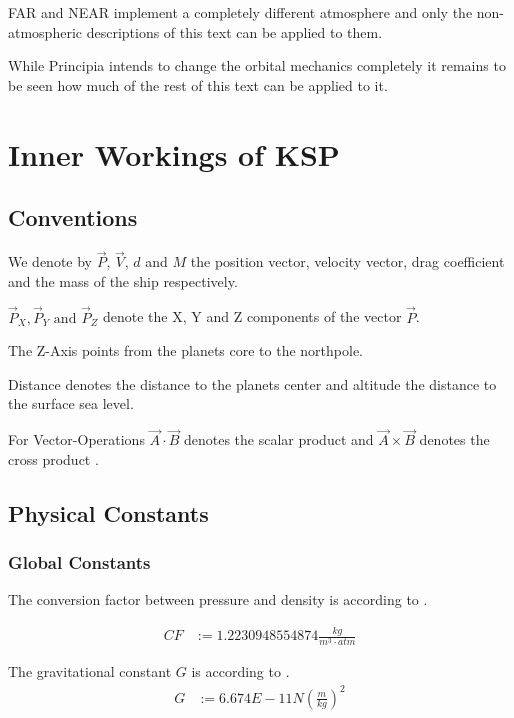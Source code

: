 \documentclass[11pt]{report}
\newcommand{\oa}[1]{\overrightarrow{#1}}
\newcommand{\Pos}{\oa{P}}
\newcommand{\Vel}{\oa{V}}
\begin{document}
FAR \cite{FAR} and NEAR \cite{NEAR} implement a completely different
atmosphere and only the non-atmospheric descriptions of this text can
be applied to them.

While Principia \cite{principia} intends to change the orbital
mechanics completely it remains to be seen how much of the rest of
this text can be applied to it.

\part{Inner Workings of KSP}\label{InnerWorkings}

\chapter{Conventions}

We denote by $\Pos$, $\Vel$, $d$ and $M$ the 
position vector,  velocity vector, drag
coefficient and the mass of the ship respectively.

$\Pos_X, \Pos_Y \textrm{ and } \Pos_Z$ denote the X, Y and Z
components of the vector $\Pos$.

The Z-Axis points from the planets core to the northpole.

Distance denotes the distance to the planets center and altitude the
distance to the surface sea level.

For Vector-Operations $\oa{A} \cdot \oa{B}$ denotes the scalar product \cite{ScalarProduct} and $\oa{A} \times \oa{B}$ denotes the cross product \cite{CrossProduct}.

\chapter{Physical Constants}

\section{Global Constants}

The  conversion factor between pressure and
density is according to \cite{Atmo}.

\begin{align}
  CF &:= 1.2230948554874 \frac{kg}{m^3\cdot atm}
\end{align}

The  gravitational constant $G$ is according to \cite{ACB}.
\begin{align}
  G &:= 6.674E-11 N\left(\frac{m}{kg}\right)^2
\end{align}
\end{document}
